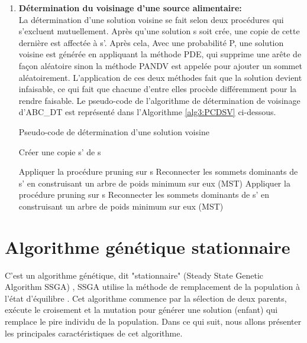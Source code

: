 \begin{enumerate}[label=\alph*)]
\begin{algorithm}[H]
{{		
	}
		
}

\end{algorithm}


	\item \textbf{Détermination du voisinage d’une source alimentaire:}\\
	La détermination d’une solution voisine se fait selon deux procédures qui s’excluent mutuellement. Après qu’une solution s soit crée, une copie de cette dernière est affectée à s’. Après cela, Avec une probabilité P, une solution voisine est générée en appliquant la méthode PDE, qui  supprime une arête de façon aléatoire sinon la méthode PANDV est appelée pour ajouter un sommet aléatoirement. L’application de ces deux méthodes fait que la solution devient infaisable, ce qui fait que chacune d’entre elles procède différemment pour la rendre faisable. Le pseudo-code de l’algorithme de détermination de voisinage d’ABC\_DT est représenté dans l’Algorithme \ref{alg3:PCDSV} ci-dessous.\\


\begin{algorithm}[H]
\label{alg3:PCDSV}
\caption{ Pseudo-code de détermination d'une solution voisine}
\SetAlgoLined
\DontPrintSemicolon
\large


Créer une copie s' de s \;


Appliquer la procédure pruning sur s \;
Reconnecter les sommets dominants de s’ en construisant un arbre de poids minimum sur eux (MST) \;
Appliquer la procédure pruning sur s \;
Reconnecter les sommets dominants de s’ en construisant un arbre de poids minimum sur
eux (MST) \;

\end{algorithm}

\end{enumerate}


\section{Algorithme génétique stationnaire }
C’est un algorithme génétique, dit "stationnaire" (Steady State Genetic Algorithm SSGA) \cite{sundar2014steady}, SSGA utilise la méthode de remplacement de la population à l'état d'équilibre \cite{davis1991handbook}. Cet algorithme commence par la sélection de deux parents, exécute le croisement et la mutation pour générer une solution (enfant) qui remplace le pire individu de la population. Dans ce qui suit, nous allons présenter les principales caractéristiques de cet algorithme.\\

